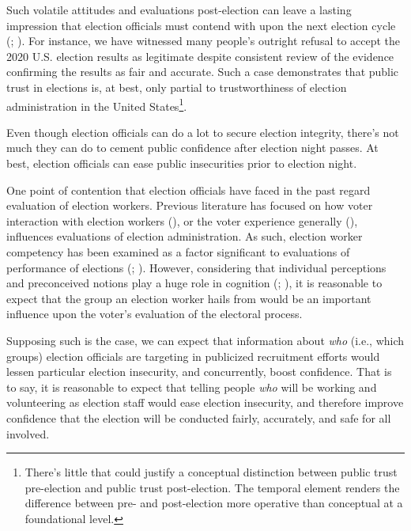 \documentclass[
  12pt,
  letterpaper,
]{article}
\begin{document}
Such volatile attitudes and evaluations post-election can leave a
lasting impression that election officials must contend with upon the
next election cycle (;
). For instance, we
have witnessed many people's outright refusal to accept the 2020 U.S.
election results as legitimate despite consistent review of the evidence
confirming the results as fair and accurate. Such a case demonstrates
that public trust in elections is, at best, only partial to
trustworthiness of election administration in the United
States\footnote{There's little that could justify a conceptual
  distinction between public trust pre-election and public trust
  post-election. The temporal element renders the difference between
  pre- and post-election more operative than conceptual at a
  foundational level.}.

Even though election officials can do a lot to secure election
integrity, there's not much they can do to cement public confidence
after election night passes. At best, election officials can ease public
insecurities prior to election night.

One point of contention that election officials have faced in the past
regard evaluation of election workers. Previous literature has focused
on how voter interaction with election workers
(), or the voter
experience generally (), influences evaluations of election administration. As such,
election worker competency has been examined as a factor significant to
evaluations of performance of elections (; ). However, considering that individual
perceptions and preconceived notions play a huge role in cognition
(;
), it is
reasonable to expect that the group an election worker hails from would
be an important influence upon the voter's evaluation of the electoral
process.

Supposing such is the case, we can expect that information about
\emph{who} (i.e., which groups) election officials are targeting in
publicized recruitment efforts would lessen particular election
insecurity, and concurrently, boost confidence. That is to say, it is
reasonable to expect that telling people \emph{who} will be working and
volunteering as election staff would ease election insecurity, and
therefore improve confidence that the election will be conducted fairly,
accurately, and safe for all involved.
\end{document}
